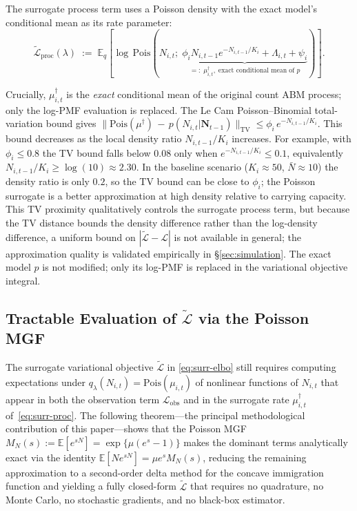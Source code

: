 \documentclass[review,12pt]{elsarticle}
\theoremstyle{definition}
\begin{document}
The surrogate process term uses a Poisson density with the exact model's
conditional mean as its rate parameter:
\begin{equation}\label{eq:surr-proc}
\tilde{\mathcal{L}}_\mathrm{proc}(\lambda)
\;:=\;
\mathbb{E}_q\!\left[\log\,\mathrm{Pois}\!\left(N_{i,t};\;
\underbrace{\phi_i N_{i,t-1}e^{-N_{i,t-1}/K_i}
+\Lambda_{i,t}+\psi_i}_{=:\;\mu^\dagger_{i,t},\;\text{exact conditional mean of }p}\right)\right].
\end{equation}

Crucially, $\mu^\dagger_{i,t}$ is the \emph{exact} conditional mean of the
original count ABM process; only the log-PMF evaluation is replaced.  The Le Cam
Poisson--Binomial total-variation bound \citep{lecam1960} gives
$\|\mathrm{Pois}(\mu^\dagger)\,-\,p(N_{i,t}|\mathbf{N}_{t-1})\|_\mathrm{TV}
\le \phi_i\,e^{-N_{i,t-1}/K_i}$.
This bound decreases as the local density ratio $N_{i,t-1}/K_i$ increases.
For example, with $\phi_i\le0.8$ the TV bound falls below $0.08$ only when
$e^{-N_{i,t-1}/K_i}\le0.1$, equivalently $N_{i,t-1}/K_i\ge\log(10)\approx2.30$.
In the baseline scenario ($K_i\approx50$, $\bar N\approx10$) the density ratio
is only $0.2$, so the TV bound can be close to $\phi_i$; the Poisson surrogate
is a better approximation at high density relative to carrying capacity.
This TV proximity qualitatively controls the surrogate process term, but because
the TV distance bounds the density difference rather than the log-density
difference, a uniform bound on $|\tilde{\mathcal{L}}-\mathcal{L}|$ is not
available in general; the approximation quality is validated empirically in
\S\ref{sec:simulation}.  The exact model $p$ is not modified; only its
log-PMF is replaced in the variational objective integral.

\subsection{Tractable Evaluation of $\tilde{\mathcal{L}}$ via the Poisson MGF}
\label{sec:elbo-terms}

The surrogate variational objective $\tilde{\mathcal{L}}$ in \eqref{eq:surr-elbo} still requires
computing expectations under $q_\lambda(N_{i,t})=\mathrm{Pois}(\mu_{i,t})$ of
nonlinear functions of $N_{i,t}$ that appear in both the observation term
$\mathcal{L}_\mathrm{obs}$ and in the surrogate rate $\mu^\dagger_{i,t}$
of~\eqref{eq:surr-proc}.  The following theorem---the principal methodological contribution of this
paper---shows that the Poisson MGF
$M_N(s):=\mathbb{E}[e^{sN}]=\exp\{\mu(e^s-1)\}$ makes the dominant terms
analytically exact via the identity $\mathbb{E}[Ne^{sN}]=\mu e^s M_N(s)$,
reducing the remaining approximation to a second-order delta method for
the concave immigration function and yielding a fully closed-form
$\tilde{\mathcal{L}}$ that requires no quadrature, no Monte Carlo,
no stochastic gradients, and no black-box estimator.
\end{document}
